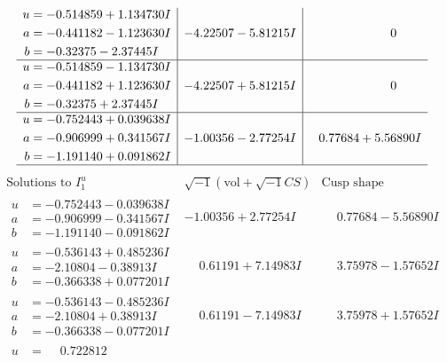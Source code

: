 \documentclass[1p]{elsarticle_modified}
\theoremstyle{definition}
\newcommand{\I}{\sqrt{-1}}
\begin{document}
$$\begin{array}{c|c|c}
\begin{aligned}
u &= -0.514859 + 1.134730 I \\
a &= -0.441182 - 1.123630 I \\
b &= -0.32375 - 2.37445 I\end{aligned}
 & -4.22507 - 5.81215 I & \phantom{-0.000000 } 0 \\ \hline\begin{aligned}
u &= -0.514859 - 1.134730 I \\
a &= -0.441182 + 1.123630 I \\
b &= -0.32375 + 2.37445 I\end{aligned}
 & -4.22507 + 5.81215 I & \phantom{-0.000000 } 0 \\ \hline\begin{aligned}
u &= -0.752443 + 0.039638 I \\
a &= -0.906999 + 0.341567 I \\
b &= -1.191140 + 0.091862 I\end{aligned}
 & -1.00356 - 2.77254 I & \phantom{-}0.77684 + 5.56890 I\\
 \hline 
 \end{array}$$\newpage$$\begin{array}{c|c|c}  
\text{Solutions to }I^u_{1}& \I (\text{vol} + \sqrt{-1}CS) & \text{Cusp shape}\\
 \hline 
\begin{aligned}
u &= -0.752443 - 0.039638 I \\
a &= -0.906999 - 0.341567 I \\
b &= -1.191140 - 0.091862 I\end{aligned}
 & -1.00356 + 2.77254 I & \phantom{-}0.77684 - 5.56890 I \\ \hline\begin{aligned}
u &= -0.536143 + 0.485236 I \\
a &= -2.10804 - 0.38913 I \\
b &= -0.366338 + 0.077201 I\end{aligned}
 & \phantom{-}0.61191 + 7.14983 I & \phantom{-}3.75978 - 1.57652 I \\ \hline\begin{aligned}
u &= -0.536143 - 0.485236 I \\
a &= -2.10804 + 0.38913 I \\
b &= -0.366338 - 0.077201 I\end{aligned}
 & \phantom{-}0.61191 - 7.14983 I & \phantom{-}3.75978 + 1.57652 I \\ \hline\begin{aligned}
u &= \phantom{-}0.722812\phantom{ +0.000000I} \\

\end{aligned}
\end{array}$$
\end{document}
